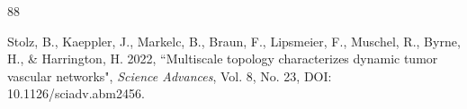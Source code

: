 \documentclass[a4paper,11pt]{article}
\theoremstyle{definition}
\begin{document}
\begin{thebibliography}{88}


 
 
 

 
 

Stolz, B., Kaeppler, J., Markelc, B., Braun, F., Lipsmeier, F., Muschel, R., Byrne, H., \& Harrington, H. 2022, ``Multiscale topology characterizes dynamic tumor vascular networks", \textit{Science Advances}, Vol. 8, No. 23, DOI: 10.1126/sciadv.abm2456. 


\end{thebibliography}
\end{document}
